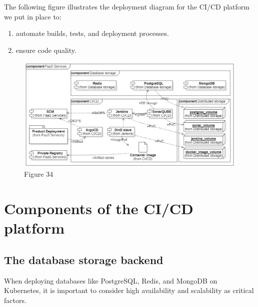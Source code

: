 The following figure illustrates the deployment diagram for the CI/CD platform we put in place to: 
\begin{enumerate}[label = (\arabic*)]
\item automate builds, tests, and deployment processes. 
\item ensure code quality. 
\end{enumerate}

\begin{figure}[H]\centering
\includegraphics[width=1.0\textwidth,angle=00]{assets/f34.png}
\caption{Figure 34 }
\label{fig:f34}
\end{figure}

\section{Components of the CI/CD platform }

\subsection{The database storage backend }

When deploying databases like PostgreSQL, Redis, and MongoDB on Kubernetes, it is important to consider high availability and scalability as critical factors. 

